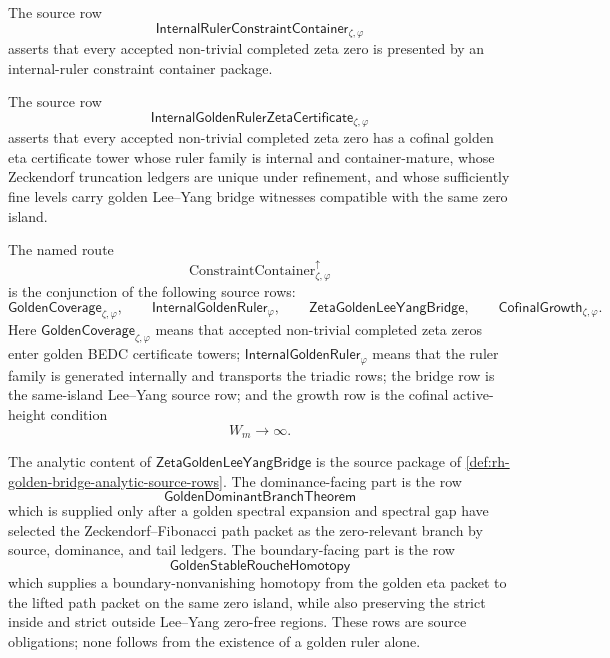 \begin{definition}
\label{def:rh-internal-ruler-constraint-container-source-row}
The source row
$$
\mathsf{InternalRulerConstraintContainer}_{\zeta,\varphi}
$$
asserts that every accepted non-trivial completed zeta zero is presented
by an internal-ruler constraint container package.
\end{definition}

\begin{definition}
\label{def:rh-internal-golden-ruler-zeta-certificate}
The source row
$$
\mathsf{InternalGoldenRulerZetaCertificate}_{\zeta,\varphi}
$$
asserts that every accepted non-trivial completed zeta zero has a
cofinal golden eta certificate tower whose ruler family is internal and
container-mature, whose Zeckendorf truncation ledgers are unique under
refinement, and whose sufficiently fine levels carry golden Lee--Yang
bridge witnesses compatible with the same zero island.
\end{definition}

\begin{definition}
\label{def:rh-golden-zeta-constraint-container-route}
The named route
$$
\mathrm{ConstraintContainer}^{\uparrow}_{\zeta,\varphi}
$$
is the conjunction of the following source rows:
$$
\mathsf{GoldenCoverage}_{\zeta,\varphi},
\qquad
\mathsf{InternalGoldenRuler}_{\varphi},
\qquad
\mathsf{ZetaGoldenLeeYangBridge},
\qquad
\mathsf{CofinalGrowth}_{\zeta,\varphi}.
$$
Here $\mathsf{GoldenCoverage}_{\zeta,\varphi}$ means that accepted
non-trivial completed zeta zeros enter golden BEDC certificate towers;
$\mathsf{InternalGoldenRuler}_{\varphi}$ means that the ruler family is
generated internally and transports the triadic rows; the bridge row is
the same-island Lee--Yang source row; and the growth row is the
cofinal active-height condition
$$
W_m\to\infty.
$$
\end{definition}

\begin{definition}
\label{def:rh-golden-bridge-analytic-subrows}
The analytic content of $\mathsf{ZetaGoldenLeeYangBridge}$ is the source
package of \autoref{def:rh-golden-bridge-analytic-source-rows}.  The
dominance-facing part is the row
$$
\mathsf{GoldenDominantBranchTheorem}
$$
which is supplied only after a golden spectral expansion and spectral
gap have selected the Zeckendorf--Fibonacci path packet as the
zero-relevant branch by source, dominance, and tail ledgers.  The
boundary-facing part is the row
$$
\mathsf{GoldenStableRoucheHomotopy}
$$
which supplies a boundary-nonvanishing homotopy from the golden eta
packet to the lifted path packet on the same zero island, while also
preserving the strict inside and strict outside Lee--Yang zero-free
regions.  These rows are source obligations; none follows from the
existence of a golden ruler alone.
\end{definition}

